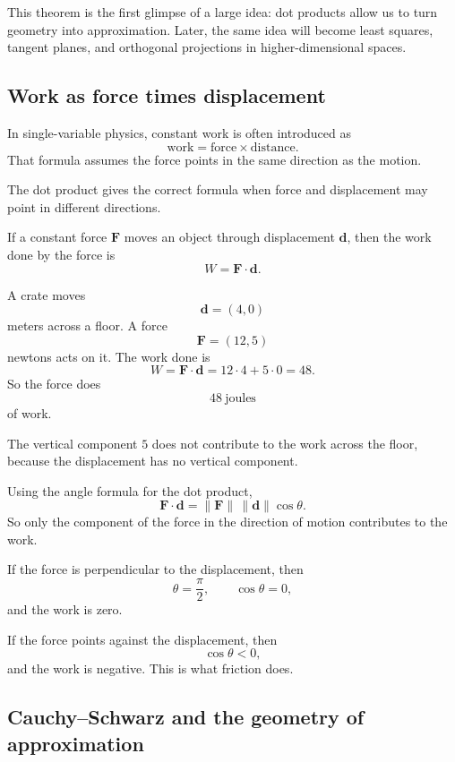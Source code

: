 This theorem is the first glimpse of a large idea: dot products allow us to turn geometry
into approximation.  Later, the same idea will become least squares, tangent planes, and
orthogonal projections in higher-dimensional spaces.

\subsection{Work as force times displacement}

In single-variable physics, constant work is often introduced as
\[
    \text{work}=\text{force}\times\text{distance}.
\]
That formula assumes the force points in the same direction as the motion.

The dot product gives the correct formula when force and displacement may point in
different directions.

\begin{definition}
If a constant force \(\mathbf F\) moves an object through displacement \(\mathbf d\),
then the work done by the force is
\[
\boxed{
    W=\mathbf F\cdot\mathbf d.
}
\]
\end{definition}

\begin{example}
A crate moves
\[
    \mathbf d=(4,0)
\]
meters across a floor.  A force
\[
    \mathbf F=(12,5)
\]
newtons acts on it.  The work done is
\[
    W=\mathbf F\cdot\mathbf d
    =
    12\cdot4+5\cdot0
    =
    48.
\]
So the force does
\[
    48\ \text{joules}
\]
of work.

The vertical component \(5\) does not contribute to the work across the floor, because
the displacement has no vertical component.
\end{example}

Using the angle formula for the dot product,
\[
    \mathbf F\cdot\mathbf d
    =
    \|\mathbf F\|\,\|\mathbf d\|\cos\theta.
\]
So only the component of the force in the direction of motion contributes to the work.

If the force is perpendicular to the displacement, then
\[
    \theta=\frac{\pi}{2},
    \qquad
    \cos\theta=0,
\]
and the work is zero.

If the force points against the displacement, then
\[
    \cos\theta<0,
\]
and the work is negative.  This is what friction does.

\subsection{Cauchy--Schwarz and the geometry of approximation}

